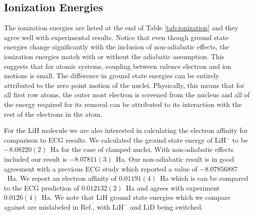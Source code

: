 \documentclass[pra,superscriptaddress,groupedaddress,twocolumn]{revtex4}
\begin{document}
\subsection{Ionization Energies}
The ionization energies are listed at the end of Table \ref{tab:ionization} and they agree well with experimental results. Notice that even though ground state energies change significantly with the inclusion of non-adiabatic effects, the ionization energies match with or without the adiabatic assumption. This suggests that for atomic systems, coupling between valence electron and ion motions is small. The difference in ground state energies can be entirely attributed to the zero point motion of the nuclei. Physically, this means that for all first row atoms, the outer most electron is screened from the nucleus and all of the energy required for its removal can be attributed to its interaction with the rest of the electrons in the atom.

For the LiH molecule we are also interested in calculating the electron affinity for comparison to ECG results. We calculated the ground state energy of LiH$^-$ to be $-8.08220(2)$~Ha for the case of clamped nuclei.  With non-adiabatic effects included our result is  $-8.07811(3)$~Ha. Our non-adiabatic result is in good agreement with a previous ECG study \cite{Bubin_LiH_noBO} which reported a value of $-8.07856887$~Ha. We report an electron affinity of $0.01191(4)$~Ha which is can be compared to the ECG prediction of $0.012132(2)$~Ha and agrees with experiment $0.0126(4)$~Ha.  We note that $\text{LiH}$ ground state energies which we compare against are mislabeled in Ref.\cite{Bubin_LiH_noBO}, with $\text{LiH}^-$ and LiD being switched.%


 
\end{document}
